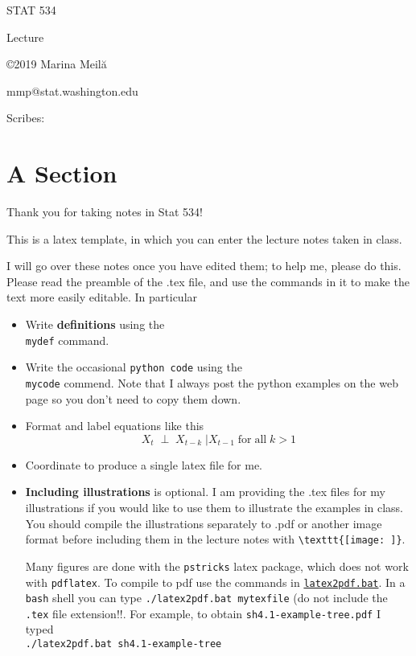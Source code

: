 \documentclass[10pt]{article}
\newcommand{\beq}{\begin{equation}}
\newcommand{\eeq}{\end{equation}}
\newcommand{\bit}{\begin{itemize}}
\newcommand{\eit}{\end{itemize}}
\newcommand{\myblue}[1]{\textcolor{myblue}{#1}}
\newcommand{\myred}[1]{\textcolor{myred}{#1}}
\newcommand{\mydef}[1]{\myred{\bf {#1}}}
\newcommand{\mycode}[1]{\myblue{\tt {#1}}}
\begin{document}
\begin{Large}
\centerline{STAT 534}
\centerline{Lecture  }  %
\centerline{\bf }       %
\centerline{}      %
\end{Large}

\centerline{\large \copyright 2019 Marina Meil\u{a}}
\centerline{\large mmp@stat.washington.edu}
\centerline{\large Scribes: }  %

\vspace{2em}
\section{A Section}
Thank you for taking notes in Stat 534!

This is a latex template, in which you can enter the lecture notes taken in class. 

I will go over these notes once you have edited them; to help me, please do this. Please read the preamble of the .tex file, and use the commands in it to make the text more easily editable. In particular
\bit
\item Write \mydef{definitions} using the {\tt \\mydef{}} command.
\item Write the occasional \mycode{python code} using the {\tt \\mycode{}} commend. Note that I always post the python examples on the web page so you don't need to copy them down. 
\item Format and label equations like this
  \beq \label{eq:markov-prop}
X_t\;\perp\;X_{t-k}\;|X_{t-1}\;\text{for}\;\text{all}\;k>1
\eeq
\item Coordinate to produce a single latex file for me.
\item \mydef{Including illustrations} is optional. I am providing the .tex files for my illustrations if you would like to use them to illustrate the examples in class. You should compile the illustrations separately to .pdf or another image format before including them in the lecture notes with \verb!\texttt{[image: ]}!.

  Many figures are done with the {\tt pstricks} latex package, which does not work with {\tt pdflatex}. To compile to pdf use the commands in \href{https://www.stat.washington.edu/mmp/courses/stat534/spring19/Handouts/latex2pdf.bat}{\tt latex2pdf.bat}. In a {\tt bash} shell you can type {\tt ./latex2pdf.bat mytexfile} (do not include the {\tt .tex} file extension!!. For example, to obtain {\tt sh4.1-example-tree.pdf} I typed
  \\
    {\tt ./latex2pdf.bat sh4.1-example-tree}
  
\eit
\end{document}
